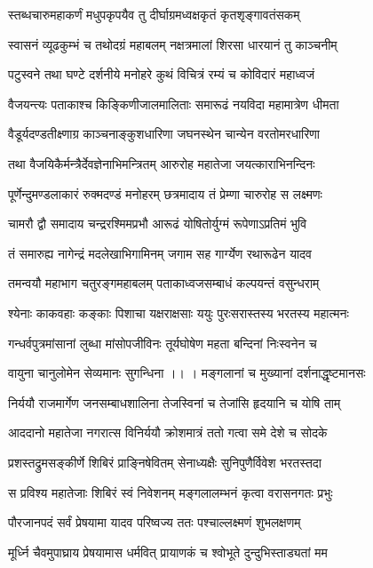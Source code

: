 \twolineshloka
{स्तब्धचारुमहाकर्णं मधुपकृपयैव तु}
{दीर्घाग्रमध्वक्षकृतं कृतशृङ्गावतंसकम्}%

\twolineshloka
{स्वासनं व्यूढकुम्भं च तथोदग्रं महाबलम्}
{नक्षत्रमालां शिरसा धारयानं तु काञ्चनीम्}%

\twolineshloka
{पटुस्वने तथा घण्टे दर्शनीये मनोहरे}
{कुथं विचित्रं रम्यं च कोविदारं महाध्वजं}%

\twolineshloka
{वैजयन्त्यः पताकाश्च किङ्किणीजालमालिताः}
{समारूढं नयविदा महामात्रेण धीमता}%

\twolineshloka
{वैडूर्यदण्डतीक्ष्णाग्र काञ्चनाङ्कुशधारिणा}
{जघनस्थेन चान्येन वरतोमरधारिणा}%

\twolineshloka
{तथा वैजयिकैर्मन्त्रैर्देवज्ञेनाभिमन्त्रितम्}
{आरुरोह महातेजा जयत्काराभिनन्दिनः}%

\twolineshloka
{पूर्णेन्दुमण्डलाकारं रुक्मदण्डं मनोहरम्}
{छत्रमादाय तं प्रेम्णा चारुरोह स लक्ष्मणः}%

\twolineshloka
{चामरौ द्वौ समादाय चन्द्ररश्मिमप्रभौ}
{आरूढं योषितोर्युग्मं रूपेणाऽप्रतिमं भुवि} %

\twolineshloka
{तं समारुह्य नागेन्द्रं मदलेखाभिगामिनम्}
{जगाम सह गार्ग्येण रथारूढेन यादव}%

\twolineshloka
{तमन्वयौ महाभाग चतुरङ्गमहाबलम्}
{पताकाध्वजसम्बाधं कल्पयन्तं वसुन्धराम्}%

\twolineshloka
{श्येनाः काकवहाः कङ्काः पिशाचा यक्षराक्षसाः}
{ययुः पुरःसरास्तस्य भरतस्य महात्मनः}%

\twolineshloka
{गन्धर्वपुत्रमांसानां लुब्धा मांसोपजीविनः}
{तूर्यघोषेण महता बन्दिनां निःस्वनेन च}%

\twolineshloka
{वायुना चानुलोमेन सेव्यमानः सुगन्धिना ।। ।}
{मङ्गलानां च मुख्यानां दर्शनाद्धृष्टमानसः}%

\twolineshloka
{निर्ययौ राजमार्गेण जनसम्बाधशालिना}
{तेजस्विनां च तेजांसि हृदयानि च योषि ताम्}%

\twolineshloka
{आददानो महातेजा नगरात्स विनिर्ययौ}
{क्रोशमात्रं ततो गत्वा समे देशे च सोदके}%

\twolineshloka
{प्रशस्तद्रुमसङ्कीर्णे शिबिरं प्राङ्निषेवितम्}
{सेनाध्यक्षैः सुनिपुणैर्विवेश भरतस्तदा}%

\twolineshloka
{स प्रविश्य महातेजाः शिबिरं स्वं निवेशनम्}
{मङ्गलालम्भनं कृत्वा वरासनगतः प्रभुः}%

\twolineshloka
{पौरजानपदं सर्वं प्रेषयामा यादव}
{परिष्वज्य ततः पश्चाल्लक्ष्मणं शुभलक्षणम्} %

\twolineshloka
{मूर्ध्नि चैवमुपाघ्राय प्रेषयामास धर्मवित्}
{प्रायाणकं च श्वोभूते दुन्दुभिस्ताड्यतां मम}%


